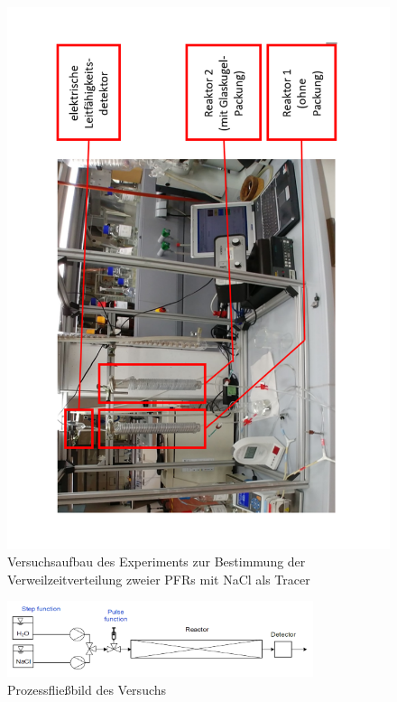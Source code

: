 \documentclass[12pt,liststotoc]{report}
\begin{document}
\begin{figure}[H]
\centering
\includegraphics[angle=270,width=1\textwidth]{Graphics/Versuchsaufbau.pdf} 
\caption[Versuchsaufbau des Experiments zur Bestimmung der Verweilzeitverteilung zweier PFRs mit NaCl als Tracer]{Versuchsaufbau des Experiments zur Bestimmung der Verweilzeitverteilung zweier PFRs mit NaCl als Tracer \cite{Skript_2018}}
\label{Versuchsaufbau}
\end{figure}
\noindent

\begin{figure}[H]
\centering
\includegraphics[width=0.8\textwidth]{Graphics/Prozessfliessbild.png} 
\caption[Prozessfließbild des Versuchs]{Prozessfließbild des Versuchs \cite{Skript_2018}}
\label{Prozessfliessbild}
\end{figure}
\noindent
\end{document}
